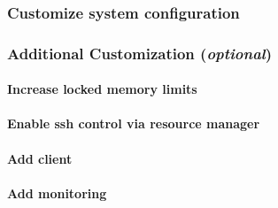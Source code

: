 \documentclass[letterpaper]{article}
\begin{document}
\subsubsection{Customize system configuration} \label{sec:master_customization}





\subsubsection{Additional Customization ({\em optional})} \label{sec:addl_customizations}


\paragraph{Increase locked memory limits}
 

\paragraph{Enable ssh control via resource manager} 


\paragraph{Add \Lustre{} client} \label{sec:lustre_client}




\clearpage
\paragraph{Add \Nagios{} monitoring}

\end{document}
